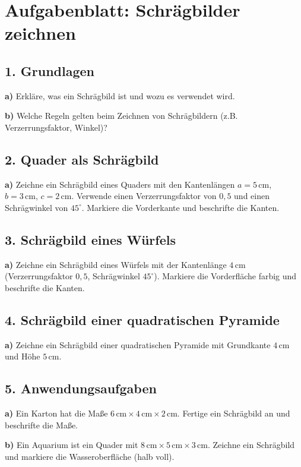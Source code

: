 
\section*{Aufgabenblatt: Schrägbilder zeichnen}

\subsection*{1. Grundlagen}
\textbf{a)} Erkläre, was ein Schrägbild ist und wozu es verwendet wird.

\textbf{b)} Welche Regeln gelten beim Zeichnen von Schrägbildern (z.B. Verzerrungsfaktor, Winkel)?

\subsection*{2. Quader als Schrägbild}
\textbf{a)} Zeichne ein Schrägbild eines Quaders mit den Kantenlängen $a=5\,\mathrm{cm}$, $b=3\,\mathrm{cm}$, $c=2\,\mathrm{cm}$. Verwende einen Verzerrungsfaktor von $0{,}5$ und einen Schrägwinkel von $45^\circ$. Markiere die Vorderkante und beschrifte die Kanten.

\subsection*{3. Schrägbild eines Würfels}
\textbf{a)} Zeichne ein Schrägbild eines Würfels mit der Kantenlänge $4\,\mathrm{cm}$ (Verzerrungsfaktor $0{,}5$, Schrägwinkel $45^\circ$). Markiere die Vorderfläche farbig und beschrifte die Kanten.

\subsection*{4. Schrägbild einer quadratischen Pyramide}
\textbf{a)} Zeichne ein Schrägbild einer quadratischen Pyramide mit Grundkante $4\,\mathrm{cm}$ und Höhe $5\,\mathrm{cm}$.

\subsection*{5. Anwendungsaufgaben}
\textbf{a)} Ein Karton hat die Maße $6\,\mathrm{cm} \times 4\,\mathrm{cm} \times 2\,\mathrm{cm}$. Fertige ein Schrägbild an und beschrifte die Maße.

\textbf{b)} Ein Aquarium ist ein Quader mit $8\,\mathrm{cm} \times 5\,\mathrm{cm} \times 3\,\mathrm{cm}$. Zeichne ein Schrägbild und markiere die Wasseroberfläche (halb voll).

